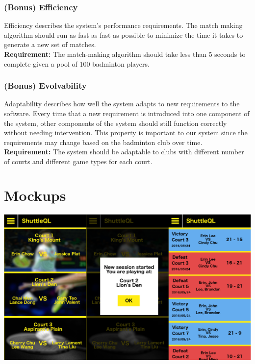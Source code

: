 \documentclass{article}
\begin{document}
\subsubsection{(Bonus) Efficiency}
Efficiency describes the system's performance requirements.
The match making algorithm should run as fast as fast as possible to minimize
the time it takes to generate a new set of matches. \\
\textbf{Requirement:} The match-making algorithm should take less than 5 seconds to complete given a pool
of 100 badminton players.

\subsubsection{(Bonus) Evolvability}
Adaptability describes how well the system adapts to new requirements to the software.
Every time that a new requirement is introduced into one component of the system,
other components of the system should still function correctly without needing intervention.
This property is important to our system since the requirements may change based on the badminton club over time. \\
\textbf{Requirement:} The system should be adaptable to clubs with different number of courts and different game types
for each court.

\newpage

\section{Mockups}
\includegraphics[width=15cm]{combined}
\end{document}
